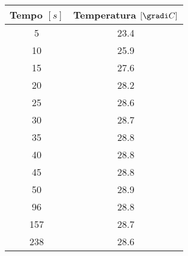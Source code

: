 \begin{tabular}{cc}
\toprule
\multicolumn{1}{c}{Tempo $[s]$ } & \multicolumn{1}{c}{Temperatura $[\gradi C]$} \\ \hline
5 & 23.4 \\ \hline
10 & 25.9 \\ \hline
15 & 27.6 \\ \hline
20 & 28.2 \\ \hline
25 & 28.6 \\ \hline
30 & 28.7 \\ \hline
35 & 28.8 \\ \hline
40 & 28.8 \\ \hline
45 & 28.8 \\ \hline
50 & 28.9 \\ \hline
96 & 28.8 \\ \hline
157 & 28.7 \\ \hline
238 & 28.6 \\ 
\hline
\end{tabular}
